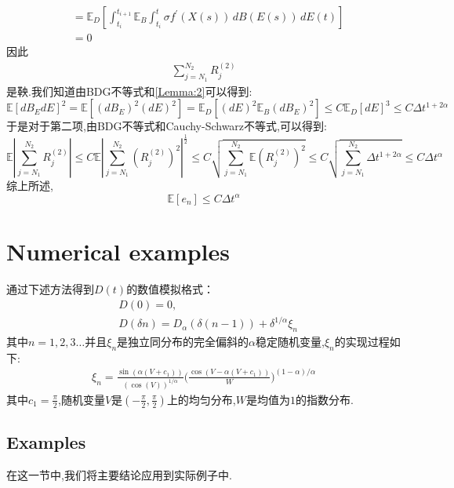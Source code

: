 \documentclass[12pt,final]{article}
\makeatletter
\theoremstyle{plain}
\renewcommand{\proofname}{Proof}
\theoremstyle{Definition}
\theoremstyle{Remark}
\renewenvironment{proof}[1][\proofname]{\par
	\pushQED{\qed}%
	\normalfont \topsep6\p@\@plus6\p@\relax
	\trivlist\item[\hskip\labelsep
	\bfseries #1\@addpunct{\,:\,}]\ignorespaces
}{%
	\popQED\endtrivlist\@endpefalse
}
\makeatother
\begin{document}
\begin{proof}
\begin{align*}
			&=\mathbb{E}_D\left[ \int_{t_i}^{t_{i+1}} \mathbb{E}_B\int_{t_i}^{t} \sigma f^{\prime}(X(s)) \, dB(E(s)) \, dE(t) \right]\\
			&= 0
		\end{align*}
		因此
		\begin{align*}
			\sum_{j=N_1}^{N_2}R_{j}^{(2)} 
		\end{align*}
		是鞅.我们知道由BDG不等式和\cref{Lemma:2}可以得到:
		\begin{equation}
			\mathbb{E}[dB_EdE]^2=\mathbb{E}[(dB_E)^2(dE)^2]=\mathbb{E}_D[(dE)^2\mathbb{E}_B(dB_E)^2]\leq
			C\mathbb{E}_{D}[dE]^3\leq C\Delta t ^{1+2\alpha}
		\end{equation}
		于是对于第二项,由BDG不等式和Cauchy-Schwarz不等式,可以得到:
		\begin{equation*}
			\mathbb{E}\left|\sum_{j=N_1}^{N_2}R_{j}^{(2)}\right|  \le C\mathbb{E} \left|\sum_{j=N_1}^{N_2}(R_{j}^{(2)})^2\right|^{\frac{1}{2}} \le C\sqrt{\sum_{j=N_1}^{N_2}\mathbb{E}(R_{j}^{(2)})^2}
			\le C\sqrt{\sum_{j=N_1}^{N_2}\Delta t^{1+2\alpha}} \le C\Delta t^{\alpha}
		\end{equation*}
		综上所述,
		\begin{equation*}
			\mathbb{E} [e_n] \leq C\Delta t^\alpha
		\end{equation*}
	\end{proof}
	\section{Numerical examples}
	通过下述方法得到$D(t)$的数值模拟格式：\\
	\begin{align*}
		&D(0)=0,\\
		&D(\delta n)=D_{\alpha}(\delta(n-1))+\delta^{1/\alpha}\xi_{n}
	\end{align*}
	其中$n=1,2,3 \ldots$并且$\xi_n$是独立同分布的完全偏斜的$\alpha$稳定随机变量,$\xi_n$的实现过程如下:
	\begin{align*}
		\xi_n=\frac{\sin(\alpha(V+c_1))}{\left(\cos(V)\right)^{1/\alpha}}\Big(\frac{\cos(V-\alpha(V+c_1))}{W}\Big)^{(1-\alpha)/\alpha}
	\end{align*}
	其中$c_1 = \frac{\pi}{2}$,随机变量$V$是$(-\frac{\pi}{2},\frac{\pi}{2})$上的均匀分布,$W$是均值为$1$的指数分布.
	\subsection{Examples}
	在这一节中,我们将主要结论应用到实际例子中.
\end{document}
